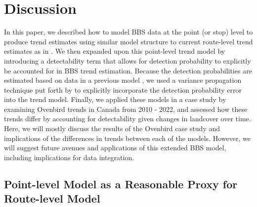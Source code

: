 \documentclass[12pt]{article}
\begin{document}
\section{Discussion}

\par In this paper, we described how to model BBS data at the point (or stop) level to produce trend estimates using similar model structure to current route-level trend estimates as in \citet{smith_spatially_2023}.
We then expanded upon this point-level trend model by introducing a detectability term that allows for detection probability to explicitly be accounted for in BBS trend estimation.
Because the detection probabilities are estimated based on data in a previous model \citep{edwards_point_2023}, we used a variance propagation technique put forth by \citet{bravington_variance_2021} to explicitly incorporate the detection probability error into the trend model.
Finally, we applied these models in a case study by examining Ovenbird trends in Canada from 2010 - 2022, and assessed how these trends differ by accounting for detectability given changes in landcover over time.
Here, we will mostly discuss the results of the Ovenbird case study and implications of the differences in trends between each of the models.
However, we will suggest future avenues and applications of this extended BBS model, including implications for data integration.

\subsection{Point-level Model as a Reasonable Proxy for Route-level Model}
\end{document}
